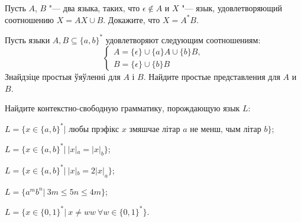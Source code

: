 \documentclass[12pt, a4paper]{article}
\begin{document}
\begin{problemList}
{Пусть $A$, $B$ "--- два языка, таких, что $\epsilon \not\in A$ и $X$ "--- язык,
удовлетворяющий соотношению $X=AX\cup B$. Докажите, что $X=A^*B$.}

\bigskip

{Пусть языки $A, B\subseteq \{a, b\}^*$ удовлетворяют следующим соотношениям:}
{%
\[
\begin{cases}
A=\{\epsilon\}\cup\{a\}A\cup\{b\}B, \\
B=\{\epsilon\}\cup\{b\}B
\end{cases}
\]
}
{Знайдзіце простыя ўяўленні для $A$ і $B$.}
{Найдите простые представления для $A$ и $B$.}

\bigskip

{Найдите контекстно-свободную грамматику, порождающую язык $L$:}
{%
\begin{belarusianEnumerate}
    \item $L=\{x\in\{a, b\}^*|\text{ любы прэфікс } x \text{ змяшчае літар } a \text{ не менш, чым літар } b\}$;
    \item $L=\{x\in\{a, b\}^*|\ |x|_a = |x|_b\}$;
    \item $L=\{x\in\{a, b\}^*|\ |x|_b = 2|x|_a\}$;
    \item $L=\{a^mb^n|\ 3m \le 5n\le 4m\}$;
    \item $L=\{x\in \{0, 1\}^*|\ x\neq ww\ \forall w\in \{0, 1\}^*\}$.
\end{belarusianEnumerate}
}

\end{problemList}
\end{document}
